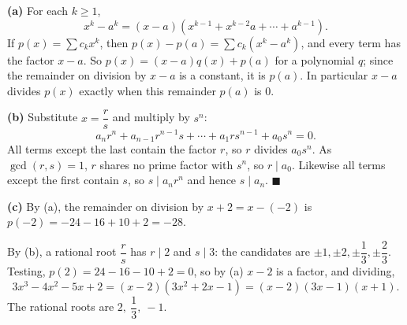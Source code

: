 \textbf{(a)} For each $k\ge1$,
\[x^k-a^k=(x-a)\left(x^{k-1}+x^{k-2}a+\cdots+a^{k-1}\right).\]
If $p(x)=\sum c_kx^k$, then $p(x)-p(a)=\sum c_k\left(x^k-a^k\right)$, and every term has the factor $x-a$. So $p(x)=(x-a)q(x)+p(a)$ for a polynomial $q$; since the remainder on division by $x-a$ is a constant, it is $p(a)$. In particular $x-a$ divides $p(x)$ exactly when this remainder $p(a)$ is $0$.

\textbf{(b)} Substitute $x=\dfrac {r}{s}$ and multiply by $s^n$:
\[a_nr^n+a_{n-1}r^{n-1}s+\cdots+a_1rs^{n-1}+a_0s^n=0 .\]
All terms except the last contain the factor $r$, so $r$ divides $a_0s^n$. As $\gcd(r,s)=1$, $r$ shares no prime factor with $s^n$, so $r\mid a_0$. Likewise all terms except the first contain $s$, so $s\mid a_nr^n$ and hence $s\mid a_n$. $\blacksquare$

\textbf{(c)} By (a), the remainder on division by $x+2=x-(-2)$ is $p(-2)=-24-16+10+2=\boxed{-28}$.

By (b), a rational root $\dfrac {r}{s}$ has $r\mid2$ and $s\mid3$: the candidates are $\pm1,\pm2,\pm\dfrac{1}{3},\pm\dfrac{2}{3}$. Testing, $p(2)=24-16-10+2=0$, so by (a) $x-2$ is a factor, and dividing,
\[3x^3-4x^2-5x+2=(x-2)(3x^2+2x-1)=(x-2)(3x-1)(x+1).\]
The rational roots are $\boxed{2,\ \dfrac{1}{3},\ -1}$.
